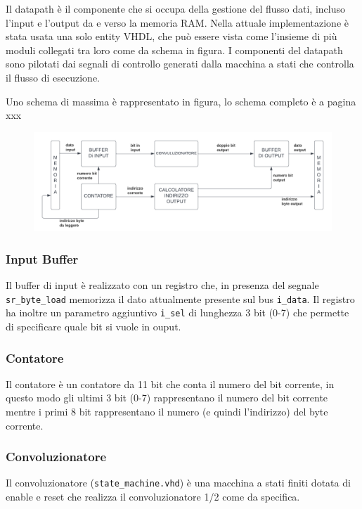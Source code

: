 \documentclass[12pt, a4paper]{article}
\begin{document}
Il datapath è il componente che si occupa della gestione del flusso dati, incluso l'input e l'output
da e verso la memoria RAM.
Nella attuale implementazione è stata usata una solo entity VHDL, che può essere vista come l'insieme
di più moduli collegati tra loro come da schema in figura.
I componenti del datapath sono pilotati dai segnali di controllo generati dalla macchina a stati che
controlla il flusso di esecuzione.

Uno schema di massima è rappresentato in figura, lo schema completo è a pagina xxx


\begin{figure}[h!]
    \includegraphics[scale=0.32]{datapath.png}
\end{figure}

\subsubsection{Input Buffer}

Il buffer di input è realizzato con un registro che, in presenza del segnale 
\texttt{sr\_byte\_load} memorizza il dato attualmente presente sul bus \texttt{i\_data}.
Il registro ha inoltre un parametro aggiuntivo \texttt{i\_sel} di lunghezza 3 bit (0-7)
che permette di specificare quale bit si vuole in ouput.

\subsubsection{Contatore}

Il contatore è un contatore da 11 bit che conta il numero del bit corrente,
in questo modo gli ultimi 3 bit (0-7) rappresentano il numero del bit corrente
mentre i primi 8 bit rappresentano il numero (e quindi l'indirizzo) del byte corrente.

\subsubsection{Convoluzionatore}

Il convoluzionatore (\texttt{state\_machine.vhd}) è una macchina a stati finiti dotata di enable e reset che
realizza il convoluzionatore 1/2 come da specifica.
\end{document}
